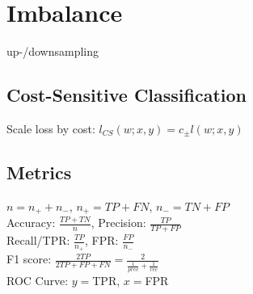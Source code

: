 \section*{Imbalance}
\noindent up-/downsampling

\subsection*{Cost-Sensitive Classification}
\noindent Scale loss by cost: $l_{CS}(w;x,y) = c_\pm l(w;x,y)$

\subsection*{Metrics}
\noindent $n = n_+ + n_-$, $n_+ = TP + FN$, $n_- = TN + FP$\\
Accuracy: $\frac{TP+TN}{n}$, 
Precision: $\frac{TP}{TP+FP}$\\ 
Recall/TPR: $\frac{TP}{n_+}$, 
FPR: $ \frac{FP}{n_-}$\\
F1 score: $\frac{2TP}{2TP+FP+FN} = \frac{2}{\frac{1}{prec} + \frac{1}{rec}}$\\
ROC Curve: $y = $TPR, $x = $FPR